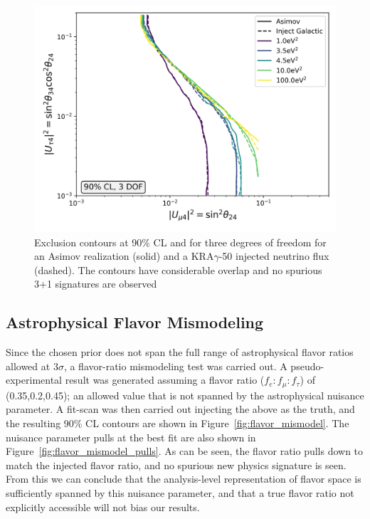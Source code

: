 \documentclass[main.tex]{subfiles}
\begin{document}
\begin{figure}
    \centering
    \includegraphics[width=0.7\linewidth]{figures/double_galactic_mismodel_fix_Realization_galactic_focus_sterile_0_cl0.9_dof3.png}
    \caption{Exclusion contours at 90\% CL and for three degrees of freedom for an Asimov realization (solid) and a KRA$\gamma$-50 injected neutrino flux (dashed). The contours have considerable overlap and no spurious 3+1 signatures are observed}\label{fig:galaxy}
\end{figure}

\subsection{Astrophysical Flavor Mismodeling}

Since the chosen prior does not span the full range of astrophysical flavor ratios allowed at $3\sigma$, a flavor-ratio mismodeling test was carried out.
A pseudo-experimental result was generated assuming a flavor ratio ($f_{e}:f_{\mu}:f_{\tau}$) of (0.35,0.2,0.45); an allowed value that is not spanned by the astrophysical nuisance parameter. 
A fit-scan was then carried out injecting the above as the truth, and the resulting 90\% CL contours are shown in Figure~\ref{fig:flavor_mismodel}. The nuisance parameter pulls at the best fit are also shown in Figure~\ref{fig:flavor_mismodel_pulls}.
As can be seen, the flavor ratio pulls down to match the injected flavor ratio, and no spurious new physics signature is seen. 
From this we can conclude that the analysis-level representation of flavor space is sufficiently spanned by this nuisance parameter, and that a true flavor ratio not explicitly accessible will not bias our results. 
\end{document}
